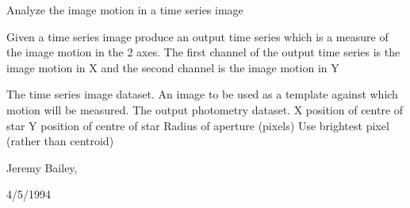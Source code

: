 \begin{manroutinedescription}
        Analyze the image motion in a time series image

        Given a time series image produce an output time series
        which is a measure of the image motion in the 2 axes.
        The first channel of the output time series is the image
        motion in X and the second channel is the image motion in Y

\begin{manparametertable}
   The time %
series image dataset.
   An %
image to be used as a template against
                                which motion will be measured.
   The %
output photometry dataset.
      X position of centre of star
      Y position of centre of star
      Radius of aperture (pixels)
   Use brightest pixel (rather %
than centroid)

\end{manparametertable}
         Jeremy Bailey, {}

         4/5/1994

\end{manroutinedescription}
